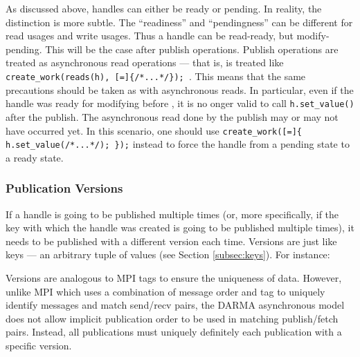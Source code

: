 As discussed above, handles can either be ready or pending. 
In reality, the distinction is more subtle. 
The ``readiness'' and ``pendingness'' can be different for read usages and write usages.
Thus a handle can be read-ready, but modify-pending.
This will be the case after publish operations.
Publish operations are treated as asynchronous read operations --- that is,
 is treated like
\verb| create_work(reads(h), [=]{/*...*/}); |. 
This means that the same precautions should be taken as with asynchronous reads. 
In particular, even if the handle was ready for modifying before
, it is no onger valid to call \lstinline!h.set_value()! after the publish.
The asynchronous read done by the publish may or may not have occurred yet.  
In this scenario, one should use \verb|create_work([=]{ h.set_value(/*...*/); });| instead
to force the handle from a pending state to a ready state.

\subsubsection{Publication Versions}
If a handle is going to be published multiple times (or, more specifically, if
the key with which the handle was created is going to be published multiple
times), it needs to be published with a different version each time.  
Versions are just like keys --- an arbitrary tuple of values (see Section \ref{subsec:keys}).  
For instance:

\begin{minipage}{0.45\textwidth}
\end{minipage}
Versions are analogous to MPI tags to ensure the uniqueness of data.
However, unlike MPI which uses a combination of message order and tag to uniquely identify messages and match send/recv pairs,
the DARMA asynchronous model does not allow implicit publication order to be used in matching publish/fetch pairs.
Instead, all publications must uniquely definitely each publication with a specific version.

